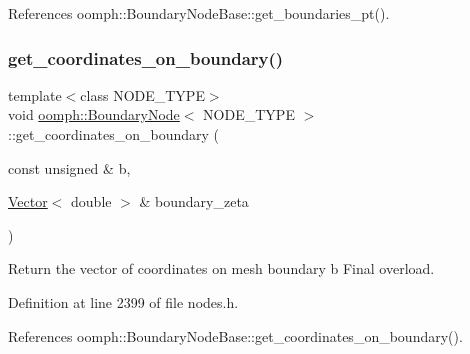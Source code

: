 References oomph\+::\+Boundary\+Node\+Base\+::get\+\_\+boundaries\+\_\+pt().

\mbox{\label{classoomph_1_1BoundaryNode_ac532d47cb38f559cae6f4ed9bdd248cd}} 
\subsubsection{\texorpdfstring{get\+\_\+coordinates\+\_\+on\+\_\+boundary()}{get\_coordinates\_on\_boundary()}\hspace{0.1cm}{\footnotesize\ttfamily [1/2]}}
{\footnotesize\ttfamily template$<$class N\+O\+D\+E\+\_\+\+T\+Y\+PE$>$ \\
void \hyperlink{classoomph_1_1BoundaryNode}{oomph\+::\+Boundary\+Node}$<$ N\+O\+D\+E\+\_\+\+T\+Y\+PE $>$\+::get\+\_\+coordinates\+\_\+on\+\_\+boundary (\begin{DoxyParamCaption}\item[{const unsigned \&}]{b,  }\item[{\hyperlink{classoomph_1_1Vector}{Vector}$<$ double $>$ \&}]{boundary\+\_\+zeta }\end{DoxyParamCaption})\hspace{0.3cm}{\ttfamily [inline]}}



Return the vector of coordinates on mesh boundary b Final overload. 



Definition at line 2399 of file nodes.\+h.



References oomph\+::\+Boundary\+Node\+Base\+::get\+\_\+coordinates\+\_\+on\+\_\+boundary().

\mbox{\label{classoomph_1_1BoundaryNode_af333382e63fa01ba1a22d9964cfe92c0}} 
